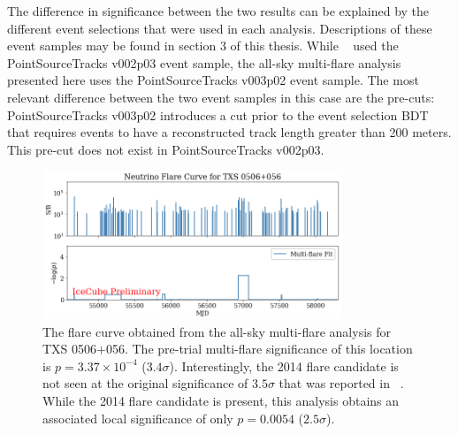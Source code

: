 The difference in significance between the two results can be explained by the different event selections that were used in each analysis. Descriptions of these event samples may be found in section 3 of this thesis. While ~\cite{TXS_Multimessenger} used the PointSourceTracks v002p03 event sample, the all-sky multi-flare analysis presented here uses the PointSourceTracks v003p02 event sample. The most relevant difference between the two event samples in this case are the pre-cuts: PointSourceTracks v003p02 introduces a cut prior to the event selection BDT that requires events to have a reconstructed track length greater than 200 meters. This pre-cut does not exist in PointSourceTracks v002p03. 

\begin{figure}[h]
\centering
\includegraphics[width=0.8\textwidth]{figs/fcurve_TXS.png}
\caption{The flare curve obtained from the all-sky multi-flare analysis for TXS 0506+056. The pre-trial multi-flare significance of this location is $p=3.37 \times 10^{-4}$ ($3.4 \sigma$). Interestingly, the 2014 flare candidate is not seen at the original significance of $3.5 \sigma$ that was reported in ~\cite{TXS_Multimessenger}. While the 2014 flare candidate is present, this analysis obtains an associated local significance of only $p=0.0054$ ($2.5 \sigma$). }
\label{fig:fcurve_txs}
\end{figure}

